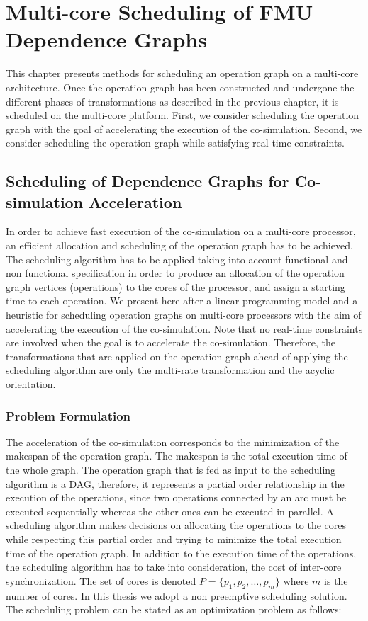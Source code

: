 \chapter{\label{ch:5-sched}Multi-core Scheduling of FMU Dependence Graphs} 

\minitoc

This chapter presents methods for scheduling an operation graph on a multi-core architecture. Once the operation graph has been constructed and undergone the different phases of transformations as described in the previous chapter, it is scheduled on the multi-core platform. First, we consider scheduling the operation graph with the goal of accelerating the execution of the co-simulation. Second, we consider scheduling the operation graph while satisfying real-time constraints.  

\section{Scheduling of Dependence Graphs for Co-simulation Acceleration}

In order to achieve fast execution of the co-simulation on a multi-core processor, an efficient allocation and scheduling of the operation graph has to be achieved. The scheduling algorithm has to be applied taking into account functional and non functional specification in order to produce an allocation of the operation graph vertices (operations) to the cores of the processor, and assign a starting time to each operation. We present here-after a linear programming model and a heuristic for scheduling operation graphs on multi-core processors with the aim of accelerating the execution of the co-simulation. Note that no real-time constraints are involved when the goal is to accelerate the co-simulation. Therefore, the transformations that are applied on the operation graph ahead of applying the scheduling algorithm are only the multi-rate transformation and the acyclic orientation. 

\subsection{\label{5:shed-prob}Problem Formulation}

The acceleration of the co-simulation corresponds to the minimization of the makespan of the operation graph. The makespan is the total execution time of the whole graph. The operation graph that is fed as input to the scheduling algorithm is a DAG, therefore, it represents a partial order relationship in the execution of the operations, since two operations connected by an arc must be executed sequentially whereas the other ones can be executed in parallel. A scheduling algorithm makes decisions on allocating the operations to the cores while respecting this partial order and trying to minimize the total execution time of the operation graph. In addition to the execution time of the operations, the scheduling algorithm has to take into consideration, the cost of inter-core synchronization. The set of cores is denoted $P = \{p_1, p_2, \ldots, p_m\}$ where $m$ is the number of cores. In this thesis we adopt a non preemptive scheduling solution. The scheduling problem can be stated as an optimization problem as follows:

